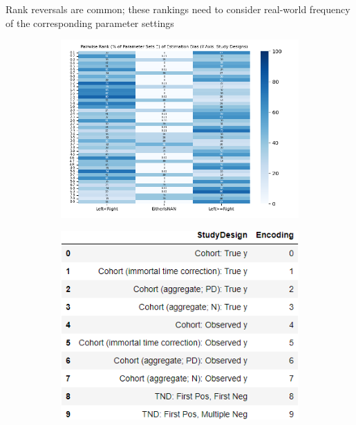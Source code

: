 \documentclass[aspectratio=169]{beamer}
\begin{document}
\begin{frame}{Rank reversals are common; these rankings need to consider real-world frequency of the corresponding parameter settings}
	\begin{figure}[H]
		\centering
		\begin{subfigure}[c]{0.48\linewidth}
			\centering
			\includegraphics[scale=0.45]{VEmethod_RelDirection1b_Pairwise}
		\end{subfigure}
		\begin{subfigure}[c]{0.48\linewidth}
			\centering
			\includegraphics[scale=0.45]{VEmethod_RelDirection1b_DictDesign}
		\end{subfigure}
	\end{figure}
\end{frame}
\end{document}
